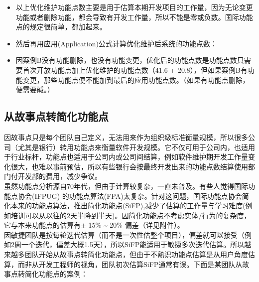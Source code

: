 \begin{itemize}
\tightlist
\item
  以上优化维护功能点数主要是用于估算本期开发项目的工作量，因为无论变更功能或者删除功能，都会导致有开发工作量，所以不能是零或负数。国际功能点的规定很简单，都加起来。\\
\item
  然后再用应用(Application)公式计算优化维护后系统的功能点数：
\end{itemize}

\begin{description}
\item[]
\end{description}

\begin{itemize}
\tightlist
\item
  因案例B没有功能删除，也没有功能变更，优化后的功能点数是功能点数只需要首次开放功能点加上优化维护的功能点数（41.6
  +
  20.8），但如果案例B有功能变更，那些功能点便不能加到最后的应用功能点数。（如果有功能点删除，便需要碱。）
\end{itemize}

\hypertarget{ux4eceux6545ux4e8bux70b9ux8f6cux7b80ux5316ux529fux80fdux70b9}{%
\subsection{从故事点转简化功能点}\label{ux4eceux6545ux4e8bux70b9ux8f6cux7b80ux5316ux529fux80fdux70b9}}

因故事点只是每个团队自己定义，无法用来作为组织级标准衡量规模，所以很多公司（尤其是银行）转用功能点来衡量软件开发规模。它不仅可用于公司内，也适用于行业标杆，功能点也适用于公司内或公司间结算，例如软件维护期开发工作量变化很大，也难以事前预估，所以有些银行会按最终开发出来的功能点数结算使用部门付开发部的费用，减少争议。\\
虽然功能点分析源自70年代，但由于计算较复杂，一直未普及。有些人觉得国际功能点协会(IFPUG)
的功能点算法(FPA)太复杂。针对这问题，国际功能点协会简化本来的功能点算法，推出简化功能点(SiFP),减少了估算的工作量与学习难度(例如培训可以从以往的2天半降到半天)。因简化功能点不考虑实体/行为的复杂度，它与本来功能点的估算有\(\pm\)
15\% \textasciitilde{} 20\% 偏差（详见附件）。\\
因敏捷团队是按每轮迭代估算（而不是一次性估整个项目），偏差就可以接受（例如2周一个迭代，偏差大概1.5天），所以SiFP能适用于敏捷多次迭代估算。所以越来越多团队开始从故事点转简化功能点，但由于不熟识功能点估算是从用户角度估算，而非从开发工程师的视角，团队初次估算SiFP通常有误。下面是某团队从故事点转简化功能点的案例：

